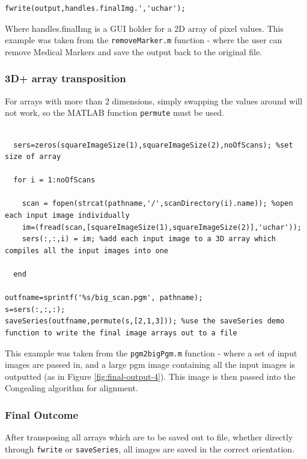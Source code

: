 \begin{lstlisting}[style=Matlab-editor,frame=single]
    fwrite(output,handles.finalImg.','uchar');
\end{lstlisting}

Where handles.finalImg is a GUI holder for a 2D array of pixel values. This example was taken from the \texttt{removeMarker.m}  function - where the user can remove Medical Markers and save the output back to the original file.

\subsubsection{3D+ array transposition}

For arrays with more than 2 dimensions, simply swapping the values around will not work, so the MATLAB function \texttt{permute} \cite{permute} must be used.

\begin{lstlisting}[style=Matlab-editor,frame=single]

  sers=zeros(squareImageSize(1),squareImageSize(2),noOfScans); %set size of array

  for i = 1:noOfScans

    scan = fopen(strcat(pathname,'/',scanDirectory(i).name)); %open each input image individually
    im=(fread(scan,[squareImageSize(1),squareImageSize(2)],'uchar'));
    sers(:,:,i) = im; %add each input image to a 3D array which compiles all the input images into one

  end

outfname=sprintf('%s/big_scan.pgm', pathname);
s=sers(:,:,:);
saveSeries(outfname,permute(s,[2,1,3])); %use the saveSeries demo function to write the final image arrays out to a file

\end{lstlisting}

This example was taken from the \texttt{pgm2bigPgm.m} function - where a set of input images are passed in, and a large pgm image containing all the input images is outputted (as in Figure \ref{fig:final-output-4}). This image is then passed into the \Gls{Congealing} algorithm for alignment.

\subsubsection{Final Outcome}

After transposing all arrays which are to be saved out to file, whether directly through \texttt{fwrite} or \texttt{saveSeries}, all images are saved in the correct orientation.

